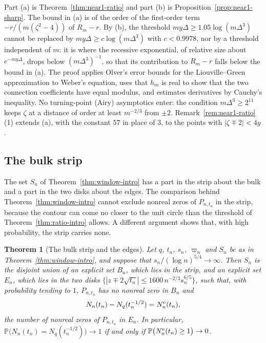\documentclass[11pt]{amsart}
\newtheorem{theorem}{Theorem}[section]
\theoremstyle{definition}
\theoremstyle{remark}
\numberwithin{equation}{section}
\newcommand{\PP}{\mathbb{P}}
\begin{document}
Part (a) is Theorem~\ref{thm:near1-ratio} and part (b) is Proposition~\ref{prop:near1-sharp}. The bound in (a) is of the order of the first-order term $-r/(m(\zeta^2-4))$ of $R_m-r$. By (b), the threshold $my\Delta\ge1.05\log(m\Delta^3)$ cannot be replaced by $my\Delta\ge c\log(m\Delta^3)$ with $c<0.9978$, nor by a threshold independent of $m$: it is where the recessive exponential, of relative size about $e^{-my\Delta}$, drops below $(m\Delta^3)^{-1}$, so that its contribution to $R_m-r$ falls below the bound in (a). The proof applies Olver's error bounds for the Liouville--Green approximation \cite{Ol,SV} to Weber's equation, uses that $h_m$ is real to show that the two connection coefficients have equal modulus, and estimates derivatives by Cauchy's inequality. No turning-point (Airy) asymptotics enter: the condition $m\Delta^3\ge2^{11}$ keeps $\zeta$ at a distance of order at least $m^{-2/3}$ from $\pm2$. Remark~\ref{rem:near1-ratio}(1) extends (a), with the constant $57$ in place of $3$, to the points with $|\zeta\mp2|<4y$.

\subsection{The bulk strip}
The set $S_n$ of Theorem~\ref{thm:window-intro} has a part in the strip about the bulk and a part in the two disks about the edges. The comparison behind Theorem~\ref{thm:window-intro} cannot exclude nonreal zeros of $P_{n,t_n}$ in the strip, because the contour can come no closer to the unit circle than the threshold of Theorem~\ref{thm:ratio-intro} allows. A different argument shows that, with high probability, the strip carries none.

\begin{theorem}[The bulk strip and the edges]\label{thm:bulk-intro}
Let $q$, $t_n$, $s_n$, $\varpi_n$ and $S_n$ be as in Theorem~\ref{thm:window-intro}, and suppose that $s_n/(\log n)^{5/4}\to\infty$. Then $S_n$ is the disjoint union of an explicit set $B_n$, which lies in the strip, and an explicit set $E_n$, which lies in the two disks $\{|z\mp2\sqrt{t_n}|\le1600\,n^{-2/3}s_n^{6/5}\}$, such that, with probability tending to $1$, $P_{n,t_n}$ has no nonreal zero in $B_n$ and
\[
N_n(t_n)-N_q(t_n^{-1/2})=N_n^{\rm e}(t_n),
\]
the number of nonreal zeros of $P_{n,t_n}$ in $E_n$. In particular, $\PP\bigl(N_n(t_n)=N_q(t_n^{-1/2})\bigr)\to1$ if and only if $\PP\bigl(N_n^{\rm e}(t_n)\ge1\bigr)\to0$.
\end{theorem}
\end{document}
